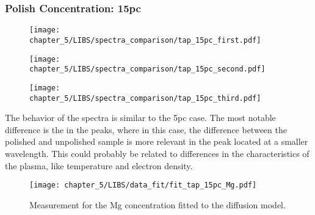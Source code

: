 \pagebreak



\subsubsection{Polish Concentration: 15pc}
\label{subsubsec:15pc}
\vspace*{-25pt}
\begin{figure}[H]
    \centering
    \texttt{[image: chapter\_5/LIBS/spectra\_comparison/tap\_15pc\_first.pdf]} 
 \end{figure}

\vspace*{-68pt}
\begin{figure}[H]
    \centering
    \texttt{[image: chapter\_5/LIBS/spectra\_comparison/tap\_15pc\_second.pdf]} 
 \end{figure}

\vspace*{-68pt}
\begin{figure}[H]
    \centering
    \texttt{[image: chapter\_5/LIBS/spectra\_comparison/tap\_15pc\_third.pdf]} 
 \end{figure}

 The behavior of the spectra is similar to the 5pc case. The most notable difference is the in the  peaks, where in this case, the difference between the polished and unpolished sample is more relevant in the peak located at a  smaller wavelength. This could probably be related to differences in the characteristics of the plasma, like temperature and electron density.

\begin{figure}[H]
    \centering
    \texttt{[image: chapter\_5/LIBS/data\_fit/fit\_tap\_15pc\_Mg.pdf]} 
    \vspace{-30pt}
    \caption{Measurement for the Mg concentration fitted to the diffusion model.}
    \label{fig:fit_tap_15pc}
 \end{figure}

